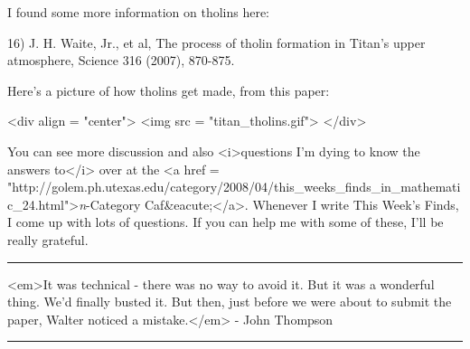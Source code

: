 I found some more information on tholins here:

16) J. H. Waite, Jr., et al, The process of tholin formation in 
Titan's upper atmosphere, Science 316 (2007), 870-875.

Here's a picture of how tholins get made, from this paper:

<div align = "center">
<img src = "titan_tholins.gif">
</div>

You can see more discussion and also <i>questions I'm dying to know
the answers to</i> over at the
<a href = "http://golem.ph.utexas.edu/category/2008/04/this_weeks_finds_in_mathematic_24.html">\emph{n}-Category Caf&eacute;</a>.  Whenever I 
write This Week's Finds, I come up with lots of questions.  If you
can help me with some of these, I'll be really grateful.

\par\noindent\rule{\textwidth}{0.4pt}
<em>It was technical - there was no way to avoid it.  But it was a 
wonderful thing.  We'd finally busted it.  But then, just before
we were about to submit the paper, Walter noticed a mistake.</em>
- John Thompson

\par\noindent\rule{\textwidth}{0.4pt}

